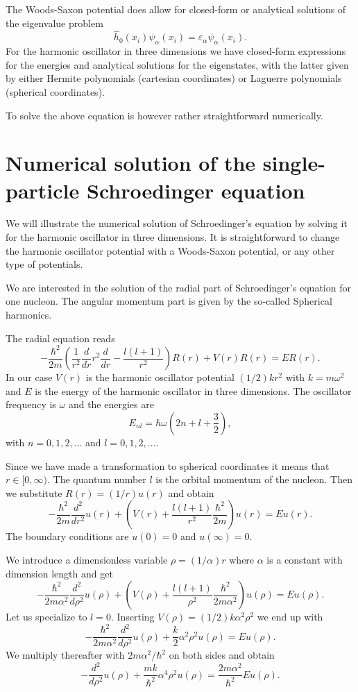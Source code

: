 \documentclass[%
twoside,                 %
final,                   %
10pt]{article}
\begin{document}
The Woods-Saxon potential does allow for closed-form or analytical solutions of the eigenvalue problem
\[
  \hat{h}_0(x_i)\psi_{\alpha}(x_i)=\varepsilon_{\alpha}\psi_{\alpha}(x_i).  
\]
For the harmonic oscillator in three dimensions we have closed-form expressions for the energies and analytical solutions for the eigenstates,
with the latter given by either Hermite polynomials (cartesian coordinates) or Laguerre polynomials (spherical coordinates).

To solve the above equation is however rather straightforward numerically. 



\section{Numerical solution of the single-particle Schroedinger equation}

We will illustrate the numerical solution of Schroedinger's equation by solving it for the harmonic oscillator in three dimensions.
It is straightforward to change the harmonic oscillator potential with a Woods-Saxon potential, or any other type of potentials. 

We are interested in the solution of the radial part of Schroedinger's equation for one nucleon. 
The angular momentum part  is given by the so-called Spherical harmonics. 

The radial equation reads
\[
  -\frac{\hbar^2}{2 m} \left ( \frac{1}{r^2} \frac{d}{dr} r^2
  \frac{d}{dr} - \frac{l (l + 1)}{r^2} \right )R(r) 
     + V(r) R(r) = E R(r).
\]
In our case $V(r)$ is the harmonic oscillator potential $(1/2)kr^2$ with
$k=m\omega^2$ and $E$ is
the energy of the harmonic oscillator in three dimensions.
The oscillator frequency is $\omega$ and the energies are
\[
E_{nl}=  \hbar \omega \left(2n+l+\frac{3}{2}\right),
\]
with $n=0,1,2,\dots$ and $l=0,1,2,\dots$.



Since we have made a transformation to spherical coordinates it means that 
$r\in [0,\infty)$.  
The quantum number
$l$ is the orbital momentum of the nucleon.   Then we substitute $R(r) = (1/r) u(r)$ and obtain
\[
  -\frac{\hbar^2}{2 m} \frac{d^2}{dr^2} u(r) 
       + \left ( V(r) + \frac{l (l + 1)}{r^2}\frac{\hbar^2}{2 m}
                                    \right ) u(r)  = E u(r) .
\]
The boundary conditions are $u(0)=0$ and $u(\infty)=0$.




We introduce a dimensionless variable $\rho = (1/\alpha) r$
where $\alpha$ is a constant with dimension length and get
\[
  -\frac{\hbar^2}{2 m \alpha^2} \frac{d^2}{d\rho^2} u(\rho) 
       + \left ( V(\rho) + \frac{l (l + 1)}{\rho^2}
         \frac{\hbar^2}{2 m\alpha^2} \right ) u(\rho)  = E u(\rho) .
\]
Let us specialize to $l=0$. 
Inserting $V(\rho) = (1/2) k \alpha^2\rho^2$ we end up with
\[
  -\frac{\hbar^2}{2 m \alpha^2} \frac{d^2}{d\rho^2} u(\rho) 
       + \frac{k}{2} \alpha^2\rho^2u(\rho)  = E u(\rho) .
\]
We multiply thereafter with $2m\alpha^2/\hbar^2$ on both sides and obtain
\[
  -\frac{d^2}{d\rho^2} u(\rho) 
       + \frac{mk}{\hbar^2} \alpha^4\rho^2u(\rho)  = \frac{2m\alpha^2}{\hbar^2}E u(\rho) .
\]
\end{document}

